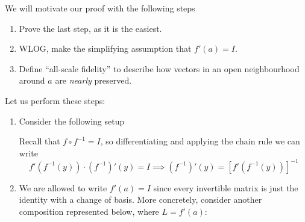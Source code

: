 \documentclass{article}
\begin{document}
We will motivate our proof with the following steps
\begin{enumerate}
    \item Prove the last step, as it is the easiest.
    \item WLOG, make the simplifying assumption that $f'(a) = I$.
    \item Define ``all-scale fidelity'' to describe how vectors in an open neighbourhood around $a$ are \textit{nearly} preserved.
\end{enumerate}
Let us perform these steps:
\begin{enumerate}
    \item Consider the following setup
    \begin{center}
    \end{center}
    Recall that $f \circ f^{-1} = I$, so differentiating and applying the chain rule we can write 
    \begin{equation}
        f'(f^{-1}(y)) \cdot (f^{-1})'(y) = I \implies (f^{-1})'(y) = [f'(f^{-1}(y))]^{-1}
    \end{equation}
    \item We are allowed to write $f'(a) = I$ since every invertible matrix is just the identity with a change of basis. More concretely, consider another composition represented below, where $L=f'(a):$
    \begin{center}
\end{center}
\end{enumerate}
\end{document}

